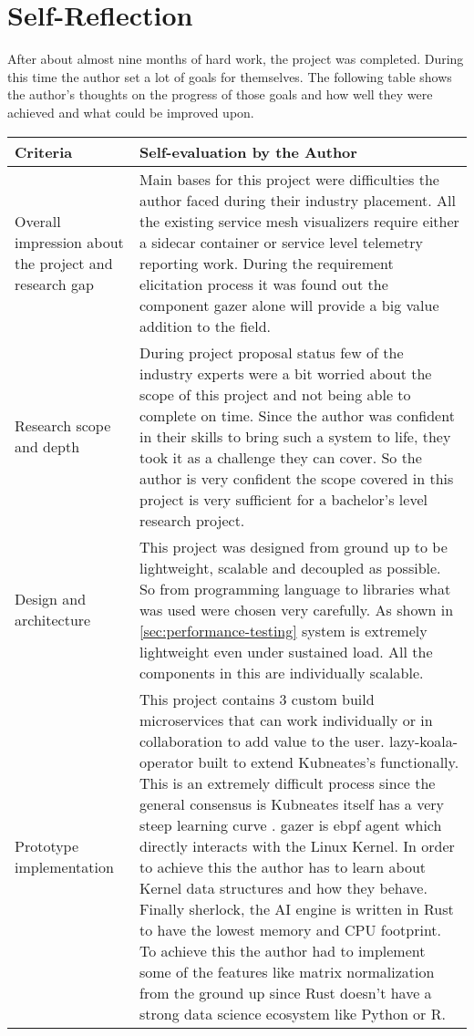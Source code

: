 \section{Self-Reflection}

After about almost nine months of hard work, the project was completed. During this time the author set a lot of goals for themselves. The following table shows the author's thoughts on the progress of those goals and how well they were achieved and what could be improved upon.

\begin{longtable}{|p{35mm}|p{125mm}|}
    \hline
    \textbf{Criteria} &
    \textbf{Self-evaluation by the Author} \\ \hline
  Overall impression about the project and research gap &
    Main bases for this project were difficulties the author faced during their industry placement. All the existing service mesh visualizers require either a sidecar container or service level telemetry reporting work. During the requirement elicitation process it was found out the component \ac{gazer} alone will provide a big value addition to the field. \\ \hline
  Research scope and depth &
    During project proposal status few of the industry experts were a bit worried about the scope of this project and not being able to complete on time. Since the author was confident in their skills to bring such a system to life, they took it as a challenge they can cover. So the author is very confident the scope covered in this project is very sufficient for a bachelor's level research project. \\ \hline
  Design and architecture &
    This project was designed from ground up to be lightweight, scalable and decoupled as possible. So from programming language to libraries what was used were chosen very carefully. As shown in \ref{sec:performance-testing} system is extremely lightweight even under sustained load. All the components in this are individually scalable. \\ \hline
  Prototype implementation &
    This project contains 3 custom build microservices that can work individually or in collaboration to add value to the user. \ac{lazy-koala-operator} built to extend Kubneates’s functionally. This is an extremely difficult process since the general consensus is Kubneates itself has a very steep learning curve \citep{Googlead4:online}. \ac{gazer} is \ac{ebpf} agent which directly interacts with the Linux Kernel. In order to achieve this the author has to learn about Kernel data structures and how they behave. Finally \ac{sherlock}, the AI engine is written in Rust to have the lowest memory and CPU footprint. To achieve this the author had to implement some of the features like matrix normalization from the ground up since Rust doesn't have a strong data science ecosystem like Python or R. \\ \hline

\end{longtable}
